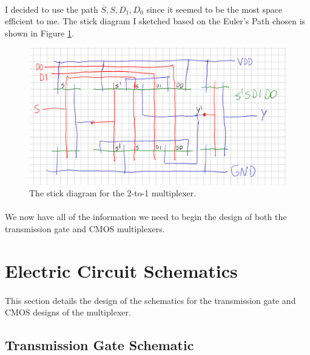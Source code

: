 \documentclass{article}
\begin{document}
  \paragraph{}
  I decided to use the path $\overline{S},S,D_1,D_0$ since it seemed to be the most space efficient to me. The stick diagram I sketched based on the Euler's Path chosen is shown in Figure \ref{fig:stick}.

  \begin{figure}[H]
    \centering
    \includegraphics[width=0.7\linewidth, frame]{screenshots/stick.png}
    \caption{The stick diagram for the 2-to-1 multiplexer.}
    \label{fig:stick}
  \end{figure}


  \paragraph{}
  We now have all of the information we need to begin the design of both the transmission gate and CMOS multiplexers.



\section{Electric Circuit Schematics}
  \paragraph{}
  This section details the design of the schematics for the transmission gate and CMOS designs of the multiplexer.

  \subsection{Transmission Gate Schematic}
\end{document}
